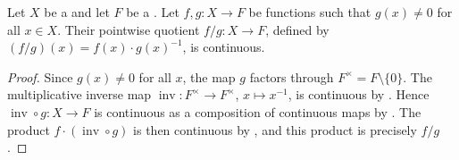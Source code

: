\begin{proposition} \label{proposition:continuity_of_pointwise_quotient_of_continuous_functions_on_topological_spaces_valued_in_topological_field}
    Let $X$ be a  and let $F$ be a . Let $f,g : X \to F$ be  functions such that $g(x) \neq 0$ for all $x \in X$. Their pointwise quotient $f/g : X \to F$, defined by $(f/g)(x) = f(x) \cdot g(x)^{-1}$, is continuous.
\end{proposition}
\begin{proof}
    Since $g(x) \neq 0$ for all $x$, the map $g$ factors through $F^\times = F \setminus \{0\}$. The multiplicative inverse map $\operatorname{inv} : F^\times \to F^\times$, $x \mapsto x^{-1}$, is continuous by . Hence $\operatorname{inv} \circ g : X \to F$ is continuous as a composition of continuous maps by . The product $f \cdot (\operatorname{inv} \circ g)$ is then continuous by , and this product is precisely $f/g$.
\end{proof}
